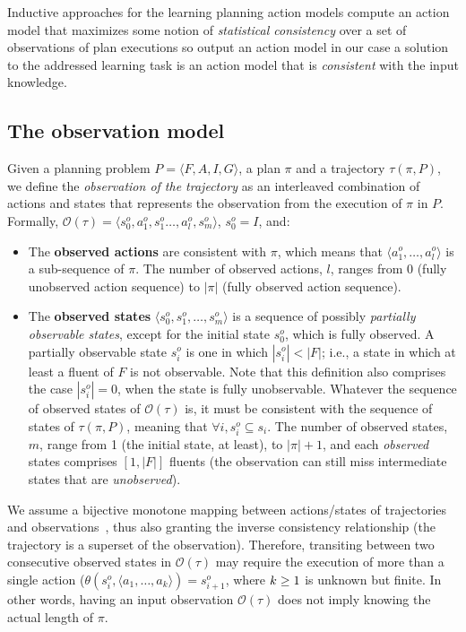 \documentclass{article}
\newcommand{\tup}[1]{{\langle #1 \rangle}}
\begin{document}
Inductive approaches for the learning planning action models compute an action model that maximizes some notion of {\em statistical consistency} over a set of observations of plan executions so output an action model in our case a solution to the addressed learning task is an action model that is {\em consistent} with the input knowledge.

\subsection{The observation model}
Given a planning problem $P=\tup{F,A,I,G}$, a plan $\pi$ and a trajectory $\tau(\pi,P)$, we define the \emph{observation of the trajectory} as an interleaved combination of actions and states that represents the observation from the execution of $\pi$ in $P$. Formally, $\mathcal{O}(\tau)=\tup{s_0^o,a_1^o,s_1^o \ldots , a_l^o, s_m^o}$, $s_0^o=I$, and:

\begin{itemize}
\item The {\bf observed actions} are consistent with $\pi$, which means that $\tup{a_1^o, \ldots, a_l^o}$ is a sub-sequence of $\pi$. The number of observed actions, $l$, ranges from $0$ (fully unobserved action sequence) to $|\pi|$ (fully observed action sequence).
\item The {\bf observed states} $\tup{s_0^o, s_1^o, \ldots, s_m^o}$ is a sequence of possibly {\em partially observable states}, except for the initial state $s_0^o$, which is fully observed. A partially observable state $s_i^o$ is one in which $|s_i^o| < |F|$; i.e., a state in which at least a fluent of $F$ is not observable. Note that this definition also comprises the case $|s_i^o| = 0$, when the state is fully unobservable. Whatever the sequence of observed states of $\mathcal{O}(\tau)$ is, it must be consistent with the sequence of states of $\tau(\pi,P)$, meaning that $\forall i, s_i^o \subseteq s_i$. The number of observed states, $m$, range from 1 (the initial state, at least), to $|\pi|+1$, and each {\em observed} states comprises $[1,|F|]$ fluents (the observation can still miss intermediate states that are {\em unobserved}).
\end{itemize}

We assume a bijective monotone mapping between actions/states of trajectories and observations~\cite{ramirez2009plan}, thus also granting the inverse consistency relationship (the trajectory is a superset of the observation). Therefore, transiting between two consecutive observed states in $\mathcal{O}(\tau)$ may require the execution of more than a single action ($\theta(s_i^o,\tup{a_1,\ldots,a_k})=s_{i+1}^o$, where ${\small k\geq 1}$ is unknown but finite. In other words, having an input observation $\mathcal{O}(\tau)$ does not imply knowing the actual length of $\pi$.
\end{document}
